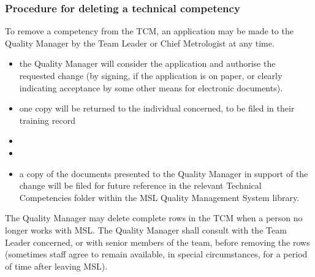 \subsubsection{Procedure for deleting a technical competency}

To remove a competency from the TCM, an application may be made to the Quality Manager by the Team Leader or Chief Metrologist at any time.

\begin{itemize}
\item the Quality Manager will consider the application and authorise the requested change (by signing, if the application is on paper, or clearly indicating acceptance by some other means for electronic documents).

\item one copy will be returned to the individual concerned, to be filed in their training record

\item {} 

\item {}

\item a copy of the documents presented to the Quality Manager in support of the change will be filed for future reference in the relevant Technical Competencies folder within the MSL Quality Management System  library.
\end{itemize}

The Quality Manager may delete complete rows in the TCM when a person no longer works with MSL. The Quality Manager shall consult with the Team Leader concerned, or with senior members of the team, before removing the rows (sometimes staff agree to remain available, in special circumstances, for a period of time after leaving MSL).

